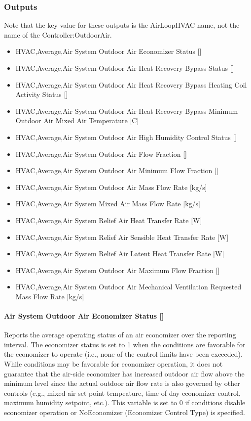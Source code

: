 \subsubsection{Outputs}\label{outputs-005}

Note that the key value for these outputs is the AirLoopHVAC name, not the name of the Controller:OutdoorAir.

\begin{itemize}
\item
  HVAC,Average,Air System Outdoor Air Economizer Status {[]}
\item
  HVAC,Average,Air System Outdoor Air Heat Recovery Bypass Status {[]}
\item
  HVAC,Average,Air System Outdoor Air Heat Recovery Bypass Heating Coil Activity Status {[]}
\item
  HVAC,Average,Air System Outdoor Air Heat Recovery Bypass Minimum Outdoor Air Mixed Air Temperature {[}C{]}
\item
  HVAC,Average,Air System Outdoor Air High Humidity Control Status {[]}
\item
  HVAC,Average,Air System Outdoor Air Flow Fraction {[]}
\item
  HVAC,Average,Air System Outdoor Air Minimum Flow Fraction {[]}
\item
  HVAC,Average,Air System Outdoor Air Mass Flow Rate {[}kg/s{]}
\item
  HVAC,Average,Air System Mixed Air Mass Flow Rate {[}kg/s{]}
\item
  HVAC,Average,Air System Relief Air Heat Transfer Rate {[}W{]}
\item
  HVAC,Average,Air System Relief Air Sensible Heat Transfer Rate {[}W{]}
\item
  HVAC,Average,Air System Relief Air Latent Heat Transfer Rate {[}W{]}
\item
  HVAC,Average,Air System Outdoor Air Maximum Flow Fraction {[]}
\item
  HVAC,Average,Air System Outdoor Air Mechanical Ventilation Requested Mass Flow Rate {[}kg/s{]}
\end{itemize}

\paragraph{Air System Outdoor Air Economizer Status {[]}}\label{air-system-outdoor-air-economizer-status}

Reports the average operating status of an air economizer over the reporting interval. The economizer status is set to 1 when the conditions are favorable for the economizer to operate (i.e., none of the control limits have been exceeded). While conditions may be favorable for economizer operation, it does not guarantee that the air-side economizer has increased outdoor air flow above the minimum level since the actual outdoor air flow rate is also governed by other controls (e.g., mixed air set point tempeature, time of day economizer control, maximum humidity setpoint, etc.). This variable is set to 0 if conditions disable economizer operation or NoEconomizer (Economizer Control Type) is specified.

